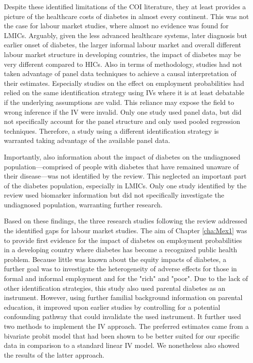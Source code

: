 Despite these identified limitations of the \ac{COI} literature, they at least provides a picture of the healthcare costs of diabetes in almost every continent. This was not the case for labour market studies, where almost no evidence was found for \acp{LMIC}. Arguably, given the less advanced healthcare systems, later diagnosis but earlier onset of diabetes, the larger informal labour market and overall different labour market structure in developing countries, the impact of diabetes may be very different compared to \acp{HIC}. Also in terms of methodology, studies had not taken advantage of panel data techniques to achieve a causal interpretation of their estimates. Especially studies on the effect on employment probabilities had relied on the same identification strategy using \acp{IV} where it is at least debatable if the underlying assumptions are valid. This reliance may expose the field to wrong inference if the \ac{IV} were invalid. Only one study used panel data, but did not specifically account for the panel structure and only used pooled regression techniques. Therefore, a study using a different identification strategy is warranted taking advantage of the available panel data.

Importantly, also information about the impact of diabetes on the undiagnosed population---comprised of people with diabetes that have remained unaware of their disease---was not identified by the review. This neglected an important part of the diabetes population, especially in \acp{LMIC}.  Only one study identified by the review used biomarker information but did not specifically investigate the undiagnosed population, warranting further research.

Based on these findings, the three research studies following the review addressed the identified gaps for labour market studies. The aim of Chapter \ref{cha:Mex1} was to provide first evidence for the impact of diabetes on employment probabilities in a developing country where diabetes has become a recognized public health problem. Because little was known about the equity impacts of diabetes, a further goal was to investigate the heterogeneity of adverse effects for those in formal and informal employment and for the "rich" and "poor". Due to the lack of other identification strategies, this study also used parental diabetes as an instrument. However, using further familial background information on parental education, it improved upon earlier studies by controlling for a potential confounding pathway that could invalidate the used instrument. It further used two methods to implement the \ac{IV} approach. The preferred estimates came from a bivariate probit model that had been shown to be better suited for our specific data in comparison to a standard linear \ac{IV} model. We nonetheless also showed the results of the latter approach.

